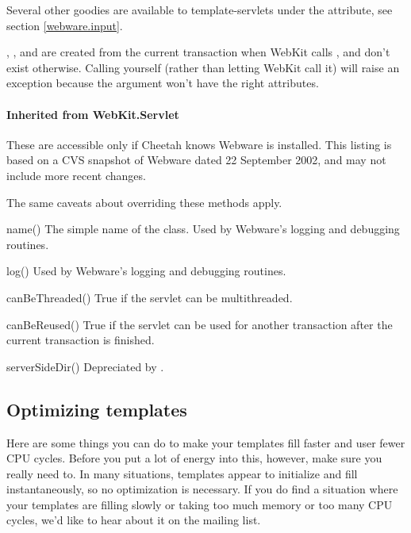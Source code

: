 Several other goodies are available to template-servlets under the 
 attribute, see section \ref{webware.input}.

, ,  and  are
created from the current transaction when WebKit calls , and don't
exist otherwise.  Calling  yourself (rather than letting WebKit
call it) will raise an exception because the  argument won't
have the right attributes.  

\paragraph*{Inherited from WebKit.Servlet}
These are accessible only if Cheetah knows Webware is installed.  This 
listing is based on a CVS snapshot of Webware dated 22 September 2002, and
may not include more recent changes.

The same caveats about overriding these methods apply.

\begin{description}
\item{name()}  The simple name of the class.  Used by Webware's logging and
    debugging routines.
\item{log()}  Used by Webware's logging and debugging routines.
\item{canBeThreaded()}  True if the servlet can be multithreaded.
\item{canBeReused()}  True if the servlet can be used for another transaction
    after the current transaction is finished.
\item{serverSideDir()}  Depreciated by .
\end{description}

\subsection{Optimizing templates}
\label{tips.optimizing}

Here are some things you can do to make your templates fill faster and user
fewer CPU cycles.  Before you put a lot of energy into this, however, make
sure you really need to.  In many situations, templates appear to initialize
and fill instantaneously, so no optimization is necessary.  If you do find a
situation where your templates are filling slowly or taking too much memory or
too many CPU cycles, we'd like to hear about it on the mailing list.

